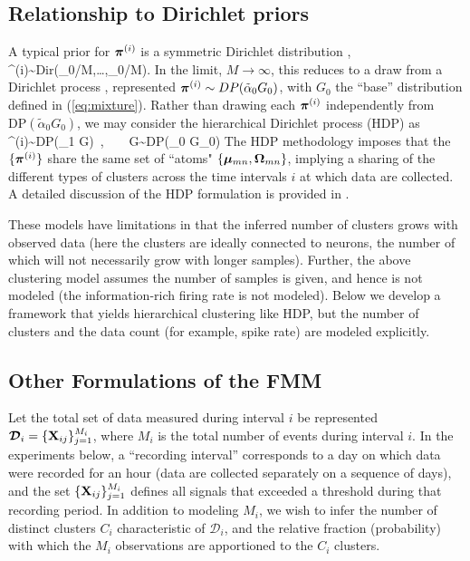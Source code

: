 \documentclass[journal]{IEEEtran}
\begin{document}
\subsection{Relationship to Dirichlet priors} \label{sec:related}



A typical prior for $\boldsymbol{\pi}^{(i)}$ is a symmetric Dirichlet distribution \cite{Dilan},
\beq \piv^{(i)}\sim\mbox{Dir}(\tilde{\alpha}_0/M,\dots,\tilde{\alpha}_0/M).\label{eq:Dir}\eeq
In the limit{,} $M\rightarrow\infty${,} this reduces to a draw from a Dirichlet process \cite{Wood2009,Bo2011}, represented $\boldsymbol{\pi}^{(i)}\sim\relax{DP}(\tilde{\alpha}_0 G_0)$, with $G_0$ the ``base'' distribution defined in (\ref{eq:mixture}). Rather than drawing each $\boldsymbol{\pi}^{(i)}$ independently {from $\mbox{DP}(\tilde{\alpha}_0 G_0)$}, we may consider the hierarchical Dirichlet process (HDP) \cite{HDP} as
\beq \piv^{(i)}\sim\mbox{DP}(\tilde{\alpha}_1 G)~,~~~~G\sim\mbox{DP}(\tilde{\alpha}_0 G_0)\eeq
The HDP methodology imposes that the $\{\boldsymbol{\pi}^{(i)}\}$ share the same set of ``atoms" $\{\boldsymbol{\mu}_{mn},\boldsymbol{\Omega}_{mn}\}$, implying
a sharing of the different types of clusters across the time intervals $i$ at which data are collected. A detailed discussion of the HDP formulation is provided in \cite{Bo2011}.

These models have limitations in that the inferred number of clusters grows with observed data (here the clusters are ideally connected to {neurons}, the number of which will not necessarily grow with  {longer samples}). Further, the above clustering model assumes the number of samples is given, and hence is not modeled (the information-rich firing rate is not modeled).
Below we develop a framework that yields hierarchical clustering like HDP, but the number of clusters and the data count (for example, spike rate) are modeled explicitly.

\subsection{Other Formulations of the FMM} %
\label{sub:other_formulations_of_the_fmm}


Let the total set of data measured during interval $i$ be represented $\bm{\mathcal{D}}_i=\{{\mathbf X}_{ij}\}_{j=1}^{M_i}${, where $M_i$ is the total number of events during interval $i$}. In the experiments below, a ``recording interval'' corresponds to a day on which data were recorded for an hour (data are collected separately on a sequence of days), and the set $\{{\mathbf X}_{ij}\}_{j=1}^{M_i}$ defines all signals that exceeded a threshold during that recording period. In addition to modeling $M_i$, we wish to infer the number of distinct clusters $C_i$ characteristic of $\bm{\mathcal{D}}_i$, and the relative fraction (probability) with which the $M_i$ observations are apportioned to the $C_i$ clusters.
\end{document}
